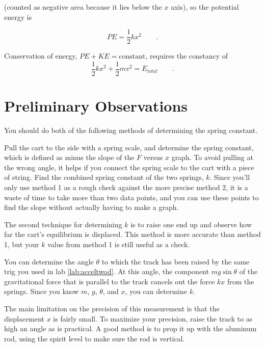 (counted as negative area because it lies below the $x$
axis), so the potential energy is

\label{spring-constant}

\begin{equation*}
      PE  =   \frac{1}{2}kx^2  \qquad   .  
\end{equation*}

Conservation of energy, $PE+KE=\text{constant}$, requires the constancy of
\begin{equation*}
      \frac{1}{2}kx^2+\frac{1}{2}mv^2 = E_{total}  \qquad   .  
\end{equation*}

\section{Preliminary Observations}

You should do both of the following methods of determining
the spring constant.


Pull the cart to the side with a spring scale, and determine the spring constant,
which is defined as minus the slope of the $F$ versus $x$ graph.
To avoid pulling at the wrong angle, it helps if you connect the spring scale
to the cart with a piece of string.
Find the combined spring constant of the two springs, $k$.
Since you'll only use method 1 as a rough check against the
more precise method 2, it is a waste of time to take more than two data points,
and you can use these points to find the slope without actually having to make
a graph.


The second technique for determining $k$ is to raise one end up
and observe how far the cart's equilibrium is displaced.
This method is more accurate than method 1, but your $k$ value from
method 1 is still useful as a check.

You can determine the angle $\theta$ to which the track has been raised by the same
trig you used in lab \ref{lab:acceltwod}. At this angle, the component $mg\sin\theta$
of the gravitational force that is parallel to the track cancels out the force
$kx$ from the springs. Since you know $m$, $g$, $\theta$, and $x$, you can determine
$k$.

The main limitation on the precision of this measurement is that the displacement $x$
is fairly small. To maximize your precision, raise the track to as high an angle as
is practical. A good method is to prop it up with the aluminum rod,
using the spirit level to make sure the rod is vertical.


